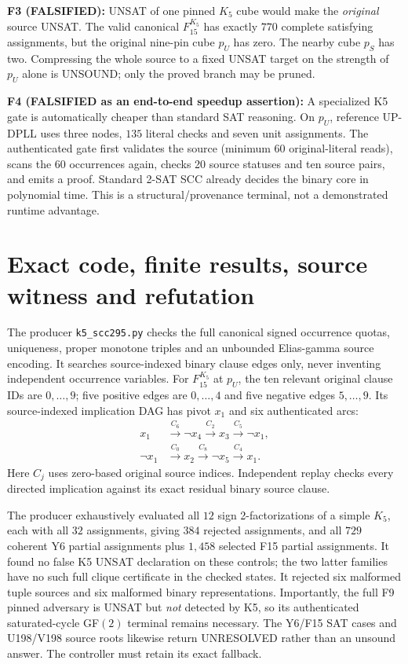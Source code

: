 \documentclass[11pt]{article}
\begin{document}
\noindent\textbf{F3 (FALSIFIED):} UNSAT of one pinned $K_5$ cube would make the \emph{original} source UNSAT. The valid canonical $F_{15}^{K_5}$ has exactly $770$ complete satisfying assignments, but the original nine-pin cube $p_U$ has zero. The nearby cube $p_S$ has two. Compressing the whole source to a fixed UNSAT target on the strength of $p_U$ alone is UNSOUND; only the proved branch may be pruned.

\noindent\textbf{F4 (FALSIFIED as an end-to-end speedup assertion):} A specialized K5 gate is automatically cheaper than standard SAT reasoning. On $p_U$, reference UP-DPLL uses three nodes, $135$ literal checks and seven unit assignments. The authenticated gate first validates the source (minimum 60 original-literal reads), scans the 60 occurrences again, checks 20 source statuses and ten source pairs, and emits a proof. Standard 2-SAT SCC already decides the binary core in polynomial time. This is a structural/provenance terminal, not a demonstrated runtime advantage.

\section{Exact code, finite results, source witness and refutation}
The producer \texttt{k5\_scc295.py} checks the full canonical signed occurrence quotas, uniqueness, proper monotone triples and an unbounded Elias-gamma source encoding. It searches source-indexed binary clause edges only, never inventing independent occurrence variables. For $F_{15}^{K_5}$ at $p_U$, the ten relevant original clause IDs are $0,\ldots,9$; five positive edges are $0,\ldots,4$ and five negative edges $5,\ldots,9$. Its source-indexed implication DAG has pivot $x_1$ and six authenticated arcs:
\[
\begin{split}
 x_1 &\xrightarrow{C_6} \neg x_4\xrightarrow{C_2}x_3\xrightarrow{C_5}\neg x_1,\\
 \neg x_1&\xrightarrow{C_0}x_2\xrightarrow{C_8}\neg x_5\xrightarrow{C_4}x_1.
\end{split}
\]
Here $C_j$ uses zero-based original source indices. Independent replay checks every directed implication against its exact residual binary source clause.

The producer exhaustively evaluated all $12$ sign 2-factorizations of a simple $K_5$, each with all $32$ assignments, giving $384$ rejected assignments, and all $729$ coherent Y6 partial assignments plus $1{,}458$ selected F15 partial assignments. It found no false K5 UNSAT declaration on these controls; the two latter families have no such full clique certificate in the checked states. It rejected six malformed tuple sources and six malformed binary representations. Importantly, the full F9 pinned adversary is UNSAT but \emph{not} detected by K5, so its authenticated saturated-cycle GF$(2)$ terminal remains necessary. The Y6/F15 SAT cases and U198/V198 source roots likewise return UNRESOLVED rather than an unsound answer. The controller must retain its exact fallback.
\end{document}

